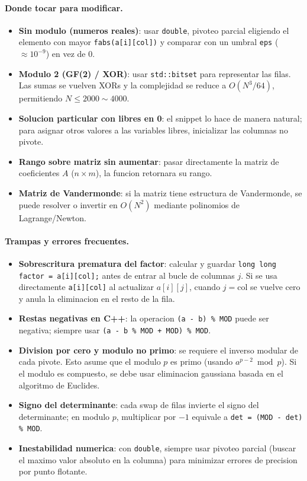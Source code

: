 \paragraph{Donde tocar para modificar.}
\begin{itemize}\setlength\itemsep{0pt}
	\item \textbf{Sin modulo (numeros reales)}: usar \texttt{double}, pivoteo parcial eligiendo el elemento con mayor \texttt{fabs(a[i][col])} y comparar con un umbral \texttt{eps} ($\approx 10^{-9}$) en vez de $0$.
	\item \textbf{Modulo 2 (GF(2) / XOR)}: usar \texttt{std::bitset} para representar las filas. Las sumas se vuelven XORs y la complejidad se reduce a $O(N^3 / 64)$, permitiendo $N \le 2000 \sim 4000$.
	\item \textbf{Solucion particular con libres en 0}: el snippet lo hace de manera natural; para asignar otros valores a las variables libres, inicializar las columnas no pivote.
	\item \textbf{Rango sobre matriz sin aumentar}: pasar directamente la matriz de coeficientes $A$ ($n \times m$), la funcion retornara su rango.
	\item \textbf{Matriz de Vandermonde}: si la matriz tiene estructura de Vandermonde, se puede resolver o invertir en $O(N^2)$ mediante polinomios de Lagrange/Newton.
\end{itemize}

\paragraph{Trampas y errores frecuentes.}
\begin{itemize}\setlength\itemsep{0pt}
	\item \textbf{Sobrescritura prematura del factor}: calcular y guardar \texttt{long long factor = a[i][col];} antes de entrar al bucle de columnas $j$. Si se usa directamente \texttt{a[i][col]} al actualizar $a[i][j]$, cuando $j = \text{col}$ se vuelve cero y anula la eliminacion en el resto de la fila.
	\item \textbf{Restas negativas en C++}: la operacion \texttt{(a - b) \% MOD} puede ser negativa; siempre usar \texttt{(a - b \% MOD + MOD) \% MOD}.
	\item \textbf{Division por cero y modulo no primo}: se requiere el inverso modular de cada pivote. Esto asume que el modulo $p$ es primo (usando $a^{p-2} \bmod p$). Si el modulo es compuesto, se debe usar eliminacion gaussiana basada en el algoritmo de Euclides.
	\item \textbf{Signo del determinante}: cada swap de filas invierte el signo del determinante; en modulo $p$, multiplicar por $-1$ equivale a \texttt{det = (MOD - det) \% MOD}.
	\item \textbf{Inestabilidad numerica}: con \texttt{double}, siempre usar pivoteo parcial (buscar el maximo valor absoluto en la columna) para minimizar errores de precision por punto flotante.
\end{itemize}

